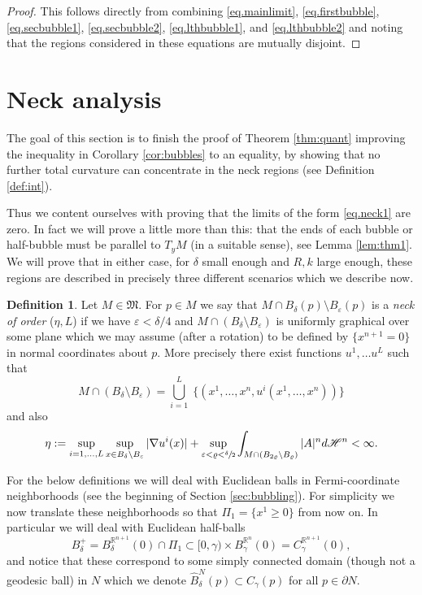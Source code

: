 \documentclass[10pt]{amsart}
\newcounter{cas}
\theoremstyle{definition}
\newtheorem{definition}[thm]{Definition}
\newcommand{\R}{\mathbb{R}}
\newcommand{\h}{\mathscr{H}}
\let\D\nabla
\let\eps\varepsilon
\begin{document}
\begin{proof}
This follows directly from combining \eqref{eq.mainlimit}, \eqref{eq.firstbubble}, \eqref{eq.secbubble1}, \eqref{eq.secbubble2}, \eqref{eq.lthbubble1}, and \eqref{eq.lthbubble2} and noting that the regions considered in these equations are mutually disjoint.
\end{proof}

\section{Neck analysis}\label{sec:neck}

The goal of this section is to finish the proof of Theorem \ref{thm:quant} improving the inequality in Corollary \ref{cor:bubbles} to an equality, by showing that no further total curvature can concentrate in the neck regions (see Definition \ref{def:int}).

Thus we content ourselves with proving that the limits of the form \eqref{eq.neck1} are zero. In fact we will prove a little more than this: that the ends of each bubble or half-bubble must be parallel to $T_y M$ (in a suitable sense), see Lemma \ref{lem:thm1}. We will prove that in either case, for $\delta$ small enough and $R,k$ large enough, these regions are described in precisely three different scenarios which we describe now.

\begin{definition}\label{neckdef}
Let $M\in \mathfrak{M}$. For $p\in M$ we say that $M\cap B_\delta(p)\setminus B_{\eps}(p)$ is a \emph{neck of order} ($\eta, L$) if we have $\eps < \delta/4$ and $M\cap (B_\delta\setminus B_{\eps})$ is uniformly graphical over some plane which we may assume (after a rotation) to be defined by $\{x^{n+1}=0\}$ in normal coordinates about $p$. More precisely there exist functions $u^1,\dots u^L$ such that
\begin{equation*}
M\cap (B_\delta \setminus B_{\eps}) = \bigcup_{i=1}^L \; \{(x^1,\dots , x^n, u^i(x^1,\dots, x^n))\}
\end{equation*}
and also
\begin{equation}
\eta:=\sup_{i=1,\ldots,L} \sup_{x\in B_\delta \setminus B_{\eps}} |\D u^i (x)| + \sup_{\eps< \varrho < \sfrac{\delta}{2}} \int_{M \cap (B_{2\varrho}\setminus B_\varrho)} |A|^n d\h^n < \infty.
\end{equation}
\end{definition}

For the below definitions we will deal with Euclidean balls in Fermi-coordinate neighborhoods (see the beginning of Section \ref{sec:bubbling}). For simplicity we now translate these neighborhoods so that $\Pi_1 = \{x^1 \geq 0\}$ from now on. In particular we will deal with Euclidean half-balls
$$B_\delta^+=B^{\R^{n+1}}_\delta (0)\cap \Pi_1\subset [0,\gamma)\times B^{\R^n}_{\gamma}(0)=C^{\R^{n+1}}_\gamma(0),$$ and notice that these correspond to some simply connected domain (though not a geodesic ball) in $N$ which we denote $\widehat{B}^N_\delta(p)\subset C_{\gamma}(p)$ for all $p\in \partial N$.
\end{document}
